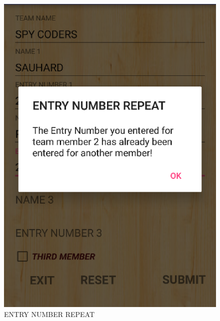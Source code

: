 \documentclass[12pt]{article}
\begin{document}
\begin{itemize}
\begin{figure}
	\includegraphics[scale=.7]{ENTRY_NUMBER_REPEAT.png}
	\caption{ENTRY NUMBER REPEAT}
\end{figure}


\end{itemize}
\end{document}
